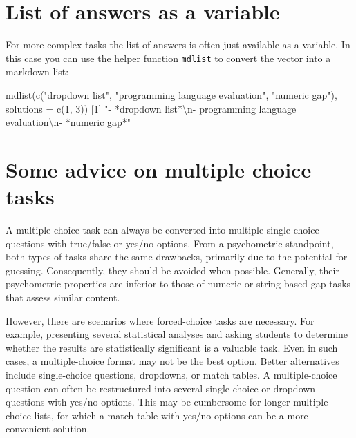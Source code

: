 \documentclass[twoside]{tufte-book}
\newenvironment{Shaded}{}{}
\newcommand{\AttributeTok}[1]{\textcolor[rgb]{0.49,0.56,0.16}{#1}}
\newcommand{\DecValTok}[1]{\textcolor[rgb]{0.25,0.63,0.44}{#1}}
\newcommand{\FunctionTok}[1]{\textcolor[rgb]{0.02,0.16,0.49}{#1}}
\newcommand{\NormalTok}[1]{#1}
\newcommand{\SpecialCharTok}[1]{\textcolor[rgb]{0.25,0.44,0.63}{#1}}
\newcommand{\StringTok}[1]{\textcolor[rgb]{0.25,0.44,0.63}{#1}}
\begin{document}
\section{List of answers as a variable}\label{list-of-answers-as-a-variable-1}

For more complex tasks the list of answers is often just available as a variable. In this case you can use the helper function \texttt{mdlist} to convert the vector into a markdown list:

\begin{Shaded}
\begin{Highlighting}[]
\FunctionTok{mdlist}\NormalTok{(}\FunctionTok{c}\NormalTok{(}\StringTok{"dropdown list"}\NormalTok{, }\StringTok{"programming language evaluation"}\NormalTok{, }\StringTok{"numeric gap"}\NormalTok{), }
       \AttributeTok{solutions =} \FunctionTok{c}\NormalTok{(}\DecValTok{1}\NormalTok{, }\DecValTok{3}\NormalTok{))}
\NormalTok{[}\DecValTok{1}\NormalTok{] }\StringTok{"{-} *dropdown list*}\SpecialCharTok{\textbackslash{}n}\StringTok{{-} programming language evaluation}\SpecialCharTok{\textbackslash{}n}\StringTok{{-} *numeric gap*"}
\end{Highlighting}
\end{Shaded}

\section{Some advice on multiple choice tasks}\label{some-advice-on-multiple-choice-tasks}

A multiple-choice task can always be converted into multiple single-choice questions with true/false or yes/no options. From a psychometric standpoint, both types of tasks share the same drawbacks, primarily due to the potential for guessing. Consequently, they should be avoided when possible. Generally, their psychometric properties are inferior to those of numeric or string-based gap tasks that assess similar content.

However, there are scenarios where forced-choice tasks are necessary. For example, presenting several statistical analyses and asking students to determine whether the results are statistically significant is a valuable task. Even in such cases, a multiple-choice format may not be the best option. Better alternatives include single-choice questions, dropdowns, or match tables. A multiple-choice question can often be restructured into several single-choice or dropdown questions with yes/no options. This may be cumbersome for longer multiple-choice lists, for which a match table with yes/no options can be a more convenient solution.
\end{document}

